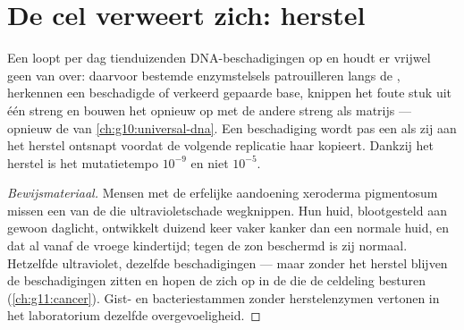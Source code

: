 \section{De cel verweert zich: herstel}

\begin{proposition}\label{prop:g11:mutations:repair}
Een  loopt per dag tienduizenden DNA-beschadigingen op en houdt er
vrijwel geen van over: daarvoor bestemde enzymstelsels patrouilleren
langs de , herkennen een beschadigde of verkeerd gepaarde
base, knippen het foute stuk uit één streng en bouwen het opnieuw op met
de andere streng als matrijs --- opnieuw de  van
\cref{ch:g10:universal-dna}. Een beschadiging wordt pas een  als
zij aan het herstel ontsnapt voordat de volgende replicatie haar
kopieert. Dankzij het herstel is het mutatietempo $10^{-9}$ en niet
$10^{-5}$.
\end{proposition}
\begin{proof}[Bewijsmateriaal]
Mensen met de erfelijke aandoening xeroderma pigmentosum missen een van
de  die ultravioletschade wegknippen. Hun huid, blootgesteld aan
gewoon daglicht, ontwikkelt duizend keer vaker kanker dan een normale
huid, en dat al vanaf de vroege kindertijd; tegen de zon beschermd is zij
normaal. Hetzelfde ultraviolet, dezelfde beschadigingen --- maar zonder
het herstel blijven de beschadigingen zitten en hopen de  zich op
in de  die de celdeling besturen (\cref{ch:g11:cancer}). Gist- en
bacteriestammen zonder herstelenzymen vertonen in het laboratorium
dezelfde overgevoeligheid.
\end{proof}

